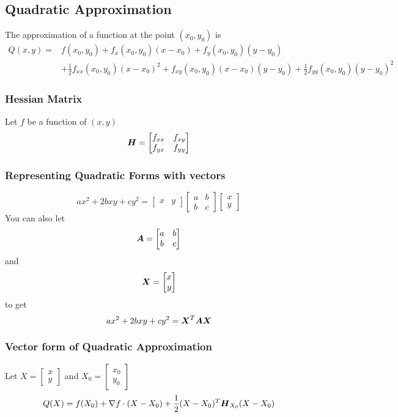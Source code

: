 \documentclass[../main.tex]{subfiles}
\begin{document}
\subsection{Quadratic Approximation}
The approximation of a function at the point $(x_0, y_0)$ is 
\begin{align*}
	Q(x,y) = &f(x_0, y_0) + f_x(x_0, y_0)(x-x_0) + f_y(x_0, y_0)(y-y_0) \\
	& + \frac12 f_{xx}(x_0, y_0)(x-x_0)^2 + f_{xy}(x_0, y_0)(x-x_0)(y-y_0) + \frac12 f_{yy}(x_0, y_0)(y-y_0)^2
\end{align*}

\subsubsection{Hessian Matrix}
Let $f$ be a function of $(x,y)$
\begin{equation*}
	\boldsymbol{H} = 
	\begin{bmatrix}
		f_{xx} & f_{xy} \\
		f_{yx} & f_{yy} 
	\end{bmatrix}
\end{equation*}

\subsubsection{Representing Quadratic Forms with vectors}
\begin{equation*}
ax^2 + 2bxy + cy^2 = 
\begin{bmatrix}
x & y
\end{bmatrix}
\begin{bmatrix}
a & b \\
b & c
\end{bmatrix}
\begin{bmatrix}
x \\
y
\end{bmatrix}
\end{equation*}
You can also let 
\begin{equation*}
\boldsymbol{A} = 
\begin{bmatrix}
a & b \\
b & c
\end{bmatrix}
\end{equation*}
and 
\begin{equation*}
\boldsymbol{X} = 
\begin{bmatrix}
x \\
y
\end{bmatrix}
\end{equation*}
to get 
\begin{equation*}
ax^2 + 2bxy + cy^2 = \boldsymbol{X}^T \boldsymbol{A} \boldsymbol{X}
\end{equation*}

\subsubsection{Vector form of Quadratic Approximation}
Let $X = \begin{bmatrix} x \\ y \end{bmatrix} $ and $X_0 = \begin{bmatrix} x_0 \\ y_0 \end{bmatrix} $
\begin{equation*}
	Q(X) = f(X_0) + \nabla f \cdot (X - X_0) + \frac12 (X - X_0)^T \boldsymbol{H}_{X_0} (X - X_0)
\end{equation*}
\end{document}
